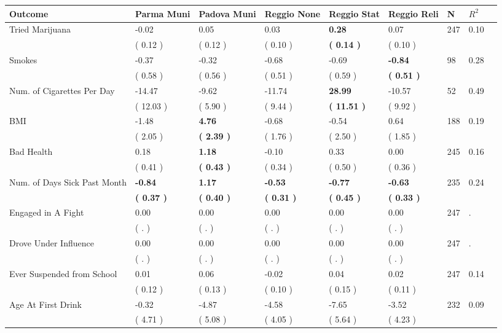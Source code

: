 \begin{tabular}{L{6.2cm} C{1.8cm} C{1.8cm} C{1.8cm} C{1.8cm} C{1.8cm} C{1.8cm} C{0.3cm} C{0.3cm}}
\toprule
 \textbf{Outcome} & \textbf{Parma Muni} & \textbf{Padova Muni} & \textbf{Reggio None} & \textbf{Reggio Stat} & \textbf{Reggio Reli} & \textbf{N} & \textbf{$ R^2$} \\
\midrule
Tried Marijuana &     -0.02 &      0.05 &      0.03 & \textbf{     0.28} &      0.07  & 247 &       0.10 \\ 
 & (     0.12 ) & (     0.12 ) & (     0.10 ) & \textbf{(     0.14 )} & (     0.10 )  & \\
Smokes &     -0.37 &     -0.32 &     -0.68 &     -0.69 & \textbf{    -0.84}  & 98 &       0.28 \\ 
 & (     0.58 ) & (     0.56 ) & (     0.51 ) & (     0.59 ) & \textbf{(     0.51 )}  & \\
Num. of Cigarettes Per Day &    -14.47 &     -9.62 &    -11.74 & \textbf{    28.99} &    -10.57  & 52 &       0.49 \\ 
 & (    12.03 ) & (     5.90 ) & (     9.44 ) & \textbf{(    11.51 )} & (     9.92 )  & \\
BMI &     -1.48 & \textbf{     4.76} &     -0.68 &     -0.54 &      0.64  & 188 &       0.19 \\ 
 & (     2.05 ) & \textbf{(     2.39 )} & (     1.76 ) & (     2.50 ) & (     1.85 )  & \\
Bad Health &      0.18 & \textbf{     1.18} &     -0.10 &      0.33 &      0.00  & 245 &       0.16 \\ 
 & (     0.41 ) & \textbf{(     0.43 )} & (     0.34 ) & (     0.50 ) & (     0.36 )  & \\
Num. of Days Sick Past Month & \textbf{    -0.84} & \textbf{     1.17} & \textbf{    -0.53} & \textbf{    -0.77} & \textbf{    -0.63}  & 235 &       0.24 \\ 
 & \textbf{(     0.37 )} & \textbf{(     0.40 )} & \textbf{(     0.31 )} & \textbf{(     0.45 )} & \textbf{(     0.33 )}  & \\
Engaged in A Fight &      0.00 &      0.00 &      0.00 &      0.00 &      0.00  & 247 &          . \\ 
 & (        . ) & (        . ) & (        . ) & (        . ) & (        . )  & \\
Drove Under Influence &      0.00 &      0.00 &      0.00 &      0.00 &      0.00  & 247 &          . \\ 
 & (        . ) & (        . ) & (        . ) & (        . ) & (        . )  & \\
Ever Suspended from School &      0.01 &      0.06 &     -0.02 &      0.04 &      0.02  & 247 &       0.14 \\ 
 & (     0.12 ) & (     0.13 ) & (     0.10 ) & (     0.15 ) & (     0.11 )  & \\
Age At First Drink &     -0.32 &     -4.87 &     -4.58 &     -7.65 &     -3.52  & 232 &       0.09 \\ 
 & (     4.71 ) & (     5.08 ) & (     4.05 ) & (     5.64 ) & (     4.23 )  & \\
\bottomrule
\end{tabular}
